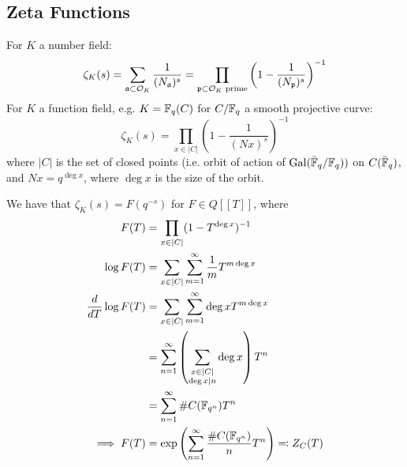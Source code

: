 \documentclass[10pt,a4paper]{article}
\begin{document}
\subsection{Zeta Functions}
For $K$ a number field:
\[\zeta_K(s) = \sum_{\mathfrak{a} \subset \mathcal{O}_K} \frac{1}{(N_{\mathfrak{a}})^s} = \prod_{\mathfrak{p}\subset \mathcal{O}_K \text{ prime}} \left(1-\frac{1}{(N_{\mathfrak{p}})^s}\right)^{-1}\]
For $K$ a function field, e.g. $K = \mathbb{F}_q(C)$ for $C/\mathbb{F}_q$ a smooth projective curve:
\[\zeta_K(s) = \prod_{x\in |C|}\left(1-\frac{1}{(Nx)^s}\right)^{-1}\]
where $|C|$ is the set of closed points (i.e. orbit of action of $\operatorname{Gal}(\bar{\mathbb{F}}_q/\mathbb{F}_q))$ on $C(\bar{\mathbb{F}}_q)$, and $Nx = q^{\deg x}$, where $\deg x$ is the size of the orbit.

We have that $\zeta_K(s) = F(q^{-s})$ for $F \in Q[[T]]$, where
\begin{align*}
  F(T) &= \prod_{x \in |C|} (1-T^{\deg x})^{-1}\\
  \log F(T) &= \sum_{x \in |C|} \sum_{m=1}^\infty \frac{1}{m}T^{m\deg x}\\
  \frac{d}{dT} \log F(T) &= \sum_{x \in |C|}\sum_{m=1}^\infty \deg x T^{m \deg x}\\
  &= \sum_{n=1}^\infty \left(\sum_{\substack{x \in |C|\\\deg x |n}} \deg x\right)T^n\\
  &= \sum_{n=1}^\infty \# C(\mathbb{F}_{q^n})T^n\\
  \implies F(T) &= \exp\left(\sum_{n=1}^\infty \frac{\#C(\mathbb{F}_{q^n})}{n}T^n\right) \eqqcolon Z_C(T)
\end{align*}
\end{document}
